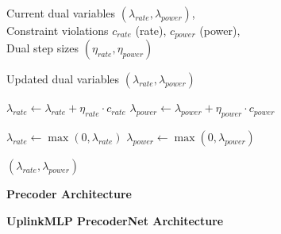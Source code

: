 \documentclass[a4paper, 12pt, onecolumn, journal, twoside, draftclsnofoot]{IEEEtran}
\begin{document}
\begin{algorithmic}[1]

\Require
Current dual variables $(\lambda_{rate}, \lambda_{power})$, \\
Constraint violations $c_{rate}$ (rate), $c_{power}$ (power), \\
Dual step sizes $(\eta_{rate}, \eta_{power})$

\Ensure
Updated dual variables $(\lambda_{rate}, \lambda_{power})$

\Statex {}


\Statex {}
\State $\lambda_{rate} \gets \lambda_{rate} + \eta_{rate} \cdot c_{rate}$
\State $\lambda_{power} \gets \lambda_{power} + \eta_{power} \cdot c_{power}$

\State $\lambda_{rate} \gets \max(0, \lambda_{rate})$
\State $\lambda_{power} \gets \max(0, \lambda_{power})$

\State \Return $(\lambda_{rate}, \lambda_{power})$

\end{algorithmic}

\newpage 

\textbf{Precoder Architecture}

\noindent\textbf{UplinkMLP PrecoderNet Architecture}
\end{document}
